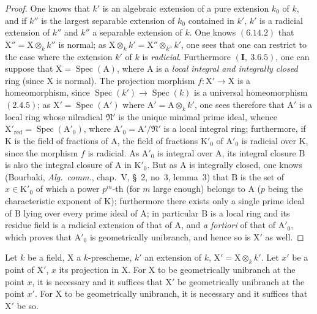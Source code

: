 \begin{proof}
One knows that $k'$ is an algebraic extension of a pure extension $k_0$ of $k$, and if $k''$
is the largest separable extension of $k_0$ contained in $k'$, $k'$ is a radicial extension
of $k''$ and $k''$ a separable extension of $k$. One knows $(6.14.2)$ that $\mathrm{X}''=\mathrm{X}\otimes_k k''$ is normal;
as $\mathrm{X}\otimes_k k'=\mathrm{X}''\otimes_{k''}k'$, one sees that one can restrict to the case where the extension $k'$ of $k$
is \emph{radicial}. Furthermore $(\mathbf{I},~3.6.5)$, one can suppose that $\mathrm{X}=\operatorname{Spec}(\mathrm{A})$, where $\mathrm{A}$ is a
\emph{local integral and integrally closed} ring (since $\mathrm{X}$ is normal). The projection morphism $f:\mathrm{X}'\to\mathrm{X}$
is a homeomorphism, since $\operatorname{Spec}(k')\to\operatorname{Spec}(k)$ is a universal homeomorphism
$(2.4.5)$; as $\mathrm{X}'=\operatorname{Spec}(\mathrm{A}')$ where $\mathrm{A}'=\mathrm{A}\otimes_k k'$, one sees therefore that $\mathrm{A}'$ is a
local ring whose nilradical $\mathfrak{N}'$ is the unique minimal prime ideal, whence $\mathrm{X}'_{\mathrm{red}}=\operatorname{Spec}(\mathrm{A}'_0)$,
where $\mathrm{A}'_0=\mathrm{A}'/\mathfrak{N}'$ is a local integral ring; furthermore, if $\mathrm{K}$ is the field of fractions of $\mathrm{A}$,
the field of fractions $\mathrm{K}'_0$ of $\mathrm{A}'_0$ is radicial over $\mathrm{K}$, since the morphism $f$ is radicial.
As $\mathrm{A}'_0$ is integral over $\mathrm{A}$, its integral closure $\mathrm{B}$ is also the integral closure of $\mathrm{A}$ in $\mathrm{K}'_0$.
But as $\mathrm{A}$ is integrally closed, one knows (Bourbaki, \emph{Alg.~comm.}, chap.~V,
\S~2, no~3, lemma~3) that $\mathrm{B}$ is the set of $x\in\mathrm{K}'_0$ of which a power $p^m$-th (for $m$
large enough) belongs to $\mathrm{A}$ ($p$ being the characteristic exponent of $\mathrm{K}$); furthermore there exists
only a single prime ideal of $\mathrm{B}$ lying over every prime ideal of $\mathrm{A}$; in particular $\mathrm{B}$
is a local ring and its residue field is a radicial extension of that of $\mathrm{A}$, and
\emph{a fortiori} of that of $\mathrm{A}'_0$, which proves that $\mathrm{A}'_0$ is geometrically unibranch, and hence
so is $\mathrm{X}'$ as well.
\end{proof}

\begin{proposition}[6.15.7]
\label{IV.6.15.7}
Let $k$ be a field, $\mathrm{X}$ a $k$-prescheme, $k'$ an extension of $k$,
$\mathrm{X}'=\mathrm{X}\otimes_k k'$. Let $x'$ be a point of $\mathrm{X}'$, $x$ its projection in $\mathrm{X}$. For $\mathrm{X}$ to be geometrically
unibranch at the point $x$, it is necessary and it suffices that $\mathrm{X}'$ be geometrically unibranch at the point $x'$. For
$\mathrm{X}$ to be geometrically unibranch, it is necessary and it suffices that $\mathrm{X}'$ be so.
\end{proposition}

